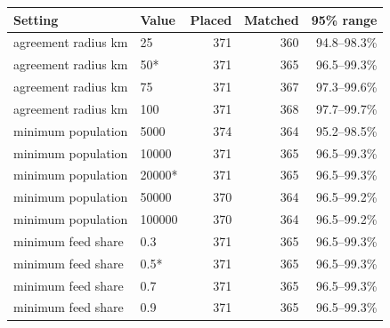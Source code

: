 \begin{tabular}{llrrr}
\toprule
Setting & Value & Placed & Matched & 95\% range \\
\midrule
agreement radius km & 25 & 371 & 360 & 94.8--98.3\% \\
agreement radius km & 50* & 371 & 365 & 96.5--99.3\% \\
agreement radius km & 75 & 371 & 367 & 97.3--99.6\% \\
agreement radius km & 100 & 371 & 368 & 97.7--99.7\% \\
minimum population & 5000 & 374 & 364 & 95.2--98.5\% \\
minimum population & 10000 & 371 & 365 & 96.5--99.3\% \\
minimum population & 20000* & 371 & 365 & 96.5--99.3\% \\
minimum population & 50000 & 370 & 364 & 96.5--99.2\% \\
minimum population & 100000 & 370 & 364 & 96.5--99.2\% \\
minimum feed share & 0.3 & 371 & 365 & 96.5--99.3\% \\
minimum feed share & 0.5* & 371 & 365 & 96.5--99.3\% \\
minimum feed share & 0.7 & 371 & 365 & 96.5--99.3\% \\
minimum feed share & 0.9 & 371 & 365 & 96.5--99.3\% \\
\bottomrule
\end{tabular}
